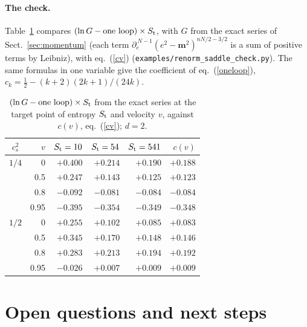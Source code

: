 \documentclass[11pt,aps,preprint,nofootinbib,superscriptaddress,tightenlines]{revtex4-2}
\def\Eq#1{eq.~(\ref{#1})}
\def\Sect#1{Sect.~\ref{#1}}
\def\Tab#1{Table~\ref{#1}}
\let\oldparagraph\paragraph
\renewcommand{\paragraph}{\par\bigskip\oldparagraph}
\begin{document}
\paragraph{The check.}  \Tab{tab:saddle} compares $(\ln G-\text{one loop})\times S_{\rm t}$, with $G$ from the exact series of \Sect{sec:momentum}
(each term $\partial_e^{\,N-1}(e^2-\bm m^2)^{nN/2-3/2}$ is a sum of positive terms by Leibniz), with \Eq{cv}
(\nolinkurl{examples/renorm_saddle_check.py}).  The same formulas in one variable give the coefficient of \Eq{oneloop},
$c_k=\tfrac12-(k+2)(2k+1)/(24k)$.

\begin{table}[h]
\caption{$(\ln G-\text{one loop})\times S_{\rm t}$ from the exact series at the target point of entropy $S_{\rm t}$ and velocity $v$, against $c(v)$, \Eq{cv}; $d=2$.}
\label{tab:saddle}
\begin{ruledtabular}
\begin{tabular}{crrrrr}
$c_s^2$ & $v$ & $S_{\rm t}=10$ & $S_{\rm t}=54$ & $S_{\rm t}=541$ & $c(v)$ \\
\hline
$1/4$ & 0    & $+0.400$ & $+0.214$ & $+0.190$ & $+0.188$ \\
      & 0.5  & $+0.247$ & $+0.143$ & $+0.125$ & $+0.123$ \\
      & 0.8  & $-0.092$ & $-0.081$ & $-0.084$ & $-0.084$ \\
      & 0.95 & $-0.395$ & $-0.354$ & $-0.349$ & $-0.348$ \\
$1/2$ & 0    & $+0.255$ & $+0.102$ & $+0.085$ & $+0.083$ \\
      & 0.5  & $+0.345$ & $+0.170$ & $+0.148$ & $+0.146$ \\
      & 0.8  & $+0.283$ & $+0.213$ & $+0.194$ & $+0.192$ \\
      & 0.95 & $-0.026$ & $+0.007$ & $+0.009$ & $+0.009$ \\
\end{tabular}
\end{ruledtabular}
\end{table}

\section{Open questions and next steps}
\label{sec:next}
\end{document}
